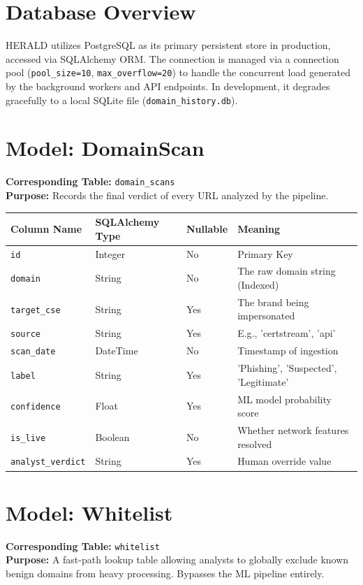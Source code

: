 \documentclass[12pt,a4paper]{report}
\begin{document}
\section{Database Overview}
HERALD utilizes PostgreSQL as its primary persistent store in production, accessed via SQLAlchemy ORM. The connection is managed via a connection pool (\texttt{pool\_size=10}, \texttt{max\_overflow=20}) to handle the concurrent load generated by the background workers and API endpoints. In development, it degrades gracefully to a local SQLite file (\texttt{domain\_history.db}).

\section{Model: DomainScan}
\textbf{Corresponding Table:} \texttt{domain\_scans} \\
\textbf{Purpose:} Records the final verdict of every URL analyzed by the pipeline.
\begin{longtable}{|p{3cm}|p{3cm}|p{2cm}|p{6cm}|}
\hline
\textbf{Column Name} & \textbf{SQLAlchemy Type} & \textbf{Nullable} & \textbf{Meaning} \\
\hline
\endhead
\texttt{id} & Integer & No & Primary Key \\
\texttt{domain} & String & No & The raw domain string (Indexed) \\
\texttt{target\_cse} & String & Yes & The brand being impersonated \\
\texttt{source} & String & Yes & E.g., 'certstream', 'api' \\
\texttt{scan\_date} & DateTime & No & Timestamp of ingestion \\
\texttt{label} & String & Yes & 'Phishing', 'Suspected', 'Legitimate' \\
\texttt{confidence} & Float & Yes & ML model probability score \\
\texttt{is\_live} & Boolean & No & Whether network features resolved \\
\texttt{analyst\_verdict} & String & Yes & Human override value \\
\hline
\end{longtable}

\section{Model: Whitelist}
\textbf{Corresponding Table:} \texttt{whitelist} \\
\textbf{Purpose:} A fast-path lookup table allowing analysts to globally exclude known benign domains from heavy processing. Bypasses the ML pipeline entirely.
\end{document}
